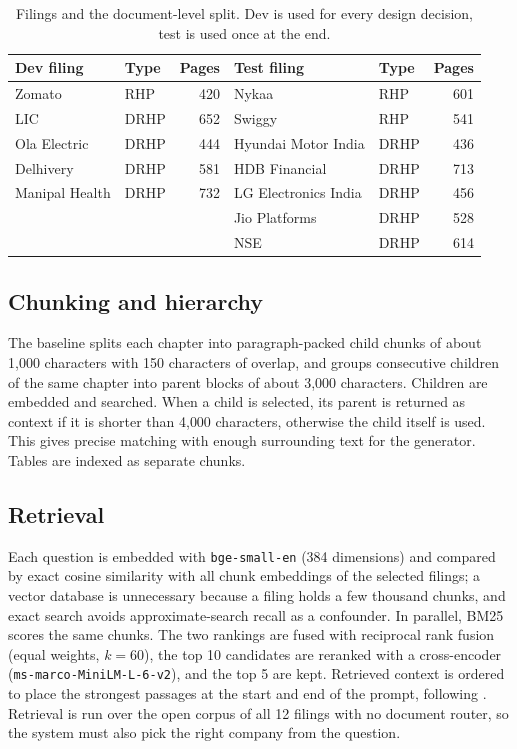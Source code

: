 \documentclass[11pt,a4paper]{article}
\begin{document}
\begin{table}[t]
\centering
\caption{Filings and the document-level split. Dev is used for every design decision, test is used once at the end.}
\label{tab:corpus}
\small
\begin{tabular}{llr|llr}
\toprule
Dev filing & Type & Pages & Test filing & Type & Pages \\
\midrule
Zomato & RHP & 420 & Nykaa & RHP & 601 \\
LIC & DRHP & 652 & Swiggy & RHP & 541 \\
Ola Electric & DRHP & 444 & Hyundai Motor India & DRHP & 436 \\
Delhivery & DRHP & 581 & HDB Financial & DRHP & 713 \\
Manipal Health & DRHP & 732 & LG Electronics India & DRHP & 456 \\
 & & & Jio Platforms & DRHP & 528 \\
 & & & NSE & DRHP & 614 \\
\bottomrule
\end{tabular}
\end{table}

\subsection{Chunking and hierarchy}
The baseline splits each chapter into paragraph-packed child chunks of about 1{,}000 characters with 150 characters of overlap, and groups consecutive children of the same chapter into parent blocks of about 3{,}000 characters. Children are embedded and searched. When a child is selected, its parent is returned as context if it is shorter than 4{,}000 characters, otherwise the child itself is used. This gives precise matching with enough surrounding text for the generator. Tables are indexed as separate chunks.

\subsection{Retrieval}
Each question is embedded with \texttt{bge-small-en} (384 dimensions) and compared by exact cosine similarity with all chunk embeddings of the selected filings; a vector database is unnecessary because a filing holds a few thousand chunks, and exact search avoids approximate-search recall as a confounder. In parallel, BM25 scores the same chunks. The two rankings are fused with reciprocal rank fusion (equal weights, $k=60$), the top 10 candidates are reranked with a cross-encoder (\texttt{ms-marco-MiniLM-L-6-v2}), and the top 5 are kept. Retrieved context is ordered to place the strongest passages at the start and end of the prompt, following \cite{liu2023lost}. Retrieval is run over the open corpus of all 12 filings with no document router, so the system must also pick the right company from the question.
\end{document}
